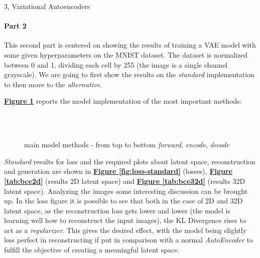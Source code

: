 \documentclass[10pt,a4paper]{article}
\begin{document}
\begin{task}{3, Variational Autoencoders}
\paragraph{Part 2}
This second part is centered on showing the results of training a VAE model with some given hyperparameters on the MNIST dataset. The dataset is normalized between 0 and 1, dividing each cell by 255 (the image is a single channel grayscale). We are going to first show the results on the \textit{standard} implementation to then move to the \textit{alternative}.

\pagebreak\textbf{\hyperref[fig:vae-code]{Figure \ref{fig:vae-code}}} reports the model implementation of the most important methods:
\begin{figure}[h!]\centering
{}\\
\\
\caption{main model methods - from top to bottom \textit{forward}, \textit{encode}, \textit{decode} }
\label{fig:vae-code}
\end{figure}

\textit{Standard} results for loss and the required plots about latent space, reconstruction and generation are shown in \textbf{\hyperref[fig:loss-standard]{Figure \ref{fig:loss-standard}}} (losses), \textbf{\hyperref[tab:bce2d]{Figure \ref{tab:bce2d}}} (results 2D latent space) and  \textbf{\hyperref[tab:bce32d]{Figure \ref{tab:bce32d}}} (results 32D latent space). Analyzing the images some interesting discussion can be brought up. In the loss figure it is possible to see that both in the case of 2D and 32D latent space, as the reconstruction loss gets lower and lower (the model is learning well how to reconstruct the input images), the KL Divergence rises to act as a \textit{regularizer}. This gives the desired effect, with the model being slightly less perfect in reconstructing if put in comparison with a normal \textit{AutoEncoder} to fulfill the objective of creating a meaningful latent space. 


\end{task}
\end{document}
